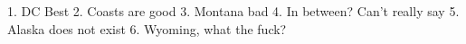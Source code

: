 1. DC Best
2. Coasts are good
3. Montana bad
4. In between? Can't really say
5. Alaska does not exist
6. Wyoming, what the fuck? 
